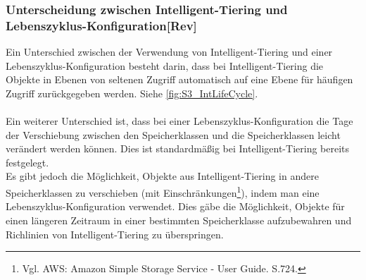\subsubsection*{Unterscheidung zwischen Intelligent-Tiering und Lebenszyklus-Konfiguration[Rev]}
Ein Unterschied zwischen der Verwendung von Intelligent-Tiering und einer Lebenszyklus-Konfiguration besteht darin, dass bei Intelligent-Tiering die Objekte in Ebenen von seltenen Zugriff automatisch auf eine Ebene für häufigen Zugriff zurückgegeben werden. Siehe \autoref{fig:S3_IntLifeCycle}.
\\\\
Ein weiterer Unterschied ist, dass bei einer Lebenszyklus-Konfiguration die Tage der Verschiebung zwischen den Speicherklassen und die Speicherklassen leicht verändert werden können. Dies ist standardmäßig bei Intelligent-Tiering bereits festgelegt. %
\\
Es gibt jedoch die Möglichkeit, Objekte aus Intelligent-Tiering in andere Speicherklassen zu verschieben (mit Einschränkungen\footnote{Vgl. AWS: Amazon Simple Storage Service - User Guide. S.724.\cite{AMZ18}}), indem man eine Lebenszyklus-Konfiguration verwendet. %
Dies gäbe die Möglichkeit, Objekte für einen längeren Zeitraum in einer bestimmten Speicherklasse aufzubewahren und Richlinien von Intelligent-Tiering zu überspringen.

